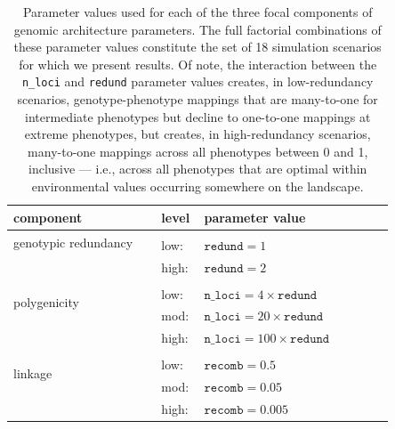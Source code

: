 \documentclass[9pt,twocolumn,twoside,lineno]{pnas-new}
\begin{document}
\begin{table}
\begin{tabular}{b{0.35\linewidth}b{0.05\linewidth}b{0.45\linewidth}}
\hline
\textbf{component} & \textbf{level} & \textbf{parameter value} \\
\hline
\multirow{2}{10em}{genotypic redundancy} \\
& low: & $\texttt{redund}=1$ \\
& high: & $\texttt{redund}=2$ \\
\hline
\multirow{3}{10em}{polygenicity} \\
& low: & $\texttt{n\_loci}=4\times \texttt{redund}$ \\ 
& mod: & $\texttt{n\_loci}=20\times \texttt{redund}$ \\
& high: & $\texttt{n\_loci}=100\times \texttt{redund}$ \\
\hline
\multirow{3}{10em}{linkage} \\
& low: & $\texttt{recomb}=0.5$ \\
& mod: & $\texttt{recomb}=0.05$ \\
& high: & $\texttt{recomb}=0.005$ \\
\hline
\end{tabular}
\medskip
\caption{\label{tab:tab_1}Parameter values used for each of the three focal components of genomic architecture parameters. The full factorial combinations of these parameter values constitute the set of 18 simulation scenarios for which we present results. Of note, the interaction between the \texttt{n\_loci} and \texttt{redund} parameter values creates, in low-redundancy scenarios, genotype-phenotype mappings that are many-to-one for intermediate phenotypes but decline to one-to-one mappings at extreme phenotypes, but creates, in high-redundancy scenarios, many-to-one mappings across all phenotypes between 0 and 1, inclusive --- i.e., across all phenotypes that are optimal within environmental values occurring somewhere on the landscape.}
\end{table}
\end{document}
